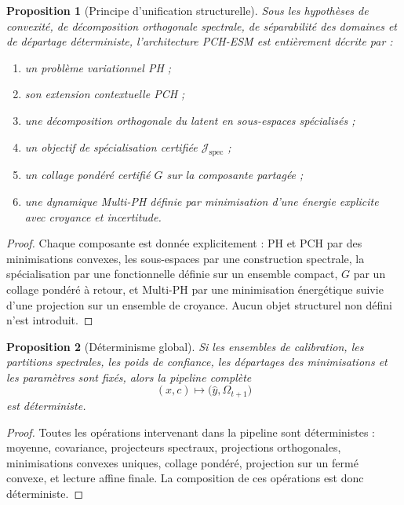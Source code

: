 \documentclass[11pt,a4paper]{article}
\newtheorem{proposition}{Proposition}[section]
\newcommand{\1}{\mathbf 1}
\begin{document}
\begin{proposition}[Principe d'unification structurelle]
Sous les hypothèses de convexité, de décomposition orthogonale spectrale, de séparabilité des domaines et de départage déterministe, l'architecture PCH-ESM est entièrement décrite par :
\begin{enumerate}[leftmargin=2em]
    \item un problème variationnel PH ;
    \item son extension contextuelle PCH ;
    \item une décomposition orthogonale du latent en sous-espaces spécialisés ;
    \item un objectif de spécialisation certifiée \(\mathcal J_{\mathrm{spec}}\) ;
    \item un collage pondéré certifié \(G\) sur la composante partagée ;
    \item une dynamique Multi-PH définie par minimisation d'une énergie explicite avec croyance et incertitude.
\end{enumerate}
\end{proposition}

\begin{proof}
Chaque composante est donnée explicitement : PH et PCH par des minimisations convexes, les sous-espaces par une construction spectrale, la spécialisation par une fonctionnelle définie sur un ensemble compact, \(G\) par un collage pondéré à retour, et Multi-PH par une minimisation énergétique suivie d'une projection sur un ensemble de croyance.  
Aucun objet structurel non défini n'est introduit.
\end{proof}

\begin{proposition}[Déterminisme global]
Si les ensembles de calibration, les partitions spectrales, les poids de confiance, les départages des minimisations et les paramètres sont fixés, alors la pipeline complète
\[
(x,c)\longmapsto \bigl(\hat y,\Omega_{t+1}\bigr)
\]
est déterministe.
\end{proposition}

\begin{proof}
Toutes les opérations intervenant dans la pipeline sont déterministes : moyenne, covariance, projecteurs spectraux, projections orthogonales, minimisations convexes uniques, collage pondéré, projection sur un fermé convexe, et lecture affine finale.  
La composition de ces opérations est donc déterministe.
\end{proof}
\end{document}
